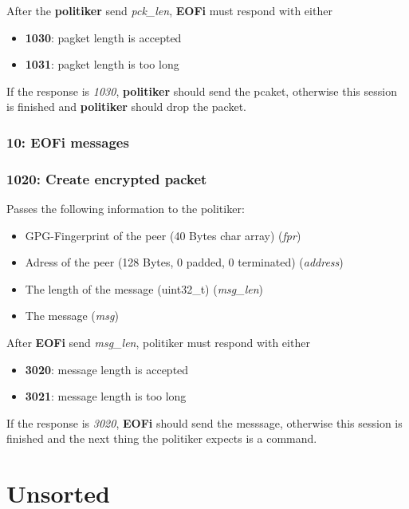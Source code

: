 \documentclass[12pt,a4paper]{book}
\begin{document}
After the \textbf{politiker} send \textit{pck\_len},
\textbf{EOFi} must respond with either
\begin{itemize}
\item \textbf{1030}: pagket length is accepted
\item \textbf{1031}: pagket length is too long
\end{itemize}

If the response is \textit{1030}, \textbf{politiker} should send the
pcaket, otherwise this session is finished and \textbf{politiker}
should drop the packet.
\subsection{10: EOFi messages}
\subsection{1020: Create encrypted packet}
Passes the following information to the politiker:
\begin{itemize}
\item GPG-Fingerprint of the peer (40 Bytes char array) (\textit{fpr})
\item Adress of the peer (128 Bytes, 0 padded, 0 terminated) (\textit{address})
\item The length of the message (uint32\_t) (\textit{msg\_len})
\item The message (\textit{msg})
\end{itemize}

After \textbf{EOFi} send \textit{msg\_len}, politiker must respond with
either
\begin{itemize}
\item \textbf{3020}: message length is accepted
\item \textbf{3021}: message length is too long
\end{itemize}

If the response is \textit{3020}, \textbf{EOFi} should send the messsage,
otherwise this session is finished and the next thing the politiker expects
is a command.

\chapter{Unsorted}
\end{document}
